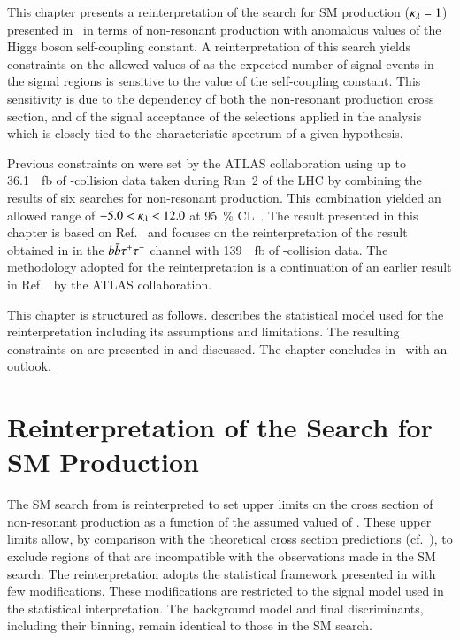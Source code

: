 This chapter presents a reinterpretation of the search for SM \HH
production ($\kappa_{\lambda} = 1$) presented in~ in terms
of non-resonant \HH production with anomalous values of the Higgs
boson self-coupling constant. A reinterpretation of this search yields
constraints on the allowed values of \klambda as the expected number
of signal events in the signal regions is sensitive to the value of
the self-coupling constant. This sensitivity is due to the \klambda
dependency of both the non-resonant \HH production cross section, and
of the signal acceptance of the selections applied in the analysis
which is closely tied to the characteristic \mHH spectrum of a given
\klambda hypothesis.

Previous constraints on \klambda were set by the ATLAS collaboration
using up to \SI{36.1}{\per\femto\barn} of \pp-collision data taken
during Run~2 of the LHC by combining the results of six searches for
non-resonant \HH production. This combination yielded an allowed range
of $-5.0 < \kappa_{\lambda} < 12.0$ at \SI{95}{\percent}
CL~\cite{HDBS-2018-58}. The result presented in this chapter is based
on Ref.~\cite{ATLAS-CONF-2021-052} and focuses on the reinterpretation
of the result obtained in  in the $b\bar{b}\tau^{+} \tau^{-}$
channel with \SI{139}{\per\femto\barn} of \pp-collision data. The
methodology adopted for the reinterpretation is a continuation of an
earlier result in Ref.~\cite{HDBS-2018-58} by the ATLAS collaboration.

This chapter is structured as follows. 
describes the statistical model used for the reinterpretation
including its assumptions and limitations. The resulting constraints
on \klambda are presented in  and
discussed. The chapter concludes
in~ with an outlook.


\section{Reinterpretation of the Search for SM \HH Production}%
\label{sec:reinterpretation}

The SM \HH search from  is reinterpreted to set
upper limits on the cross section of non-resonant \HH production as a
function of the assumed valued of \klambda. These upper limits allow,
by comparison with the theoretical cross section predictions
(cf.~), to exclude regions of \klambda that are
incompatible with the observations made in the SM \HH search. The
reinterpretation adopts the statistical framework presented in
 with few modifications. These
modifications are restricted to the signal model used in the
statistical interpretation. The background model and final
discriminants, including their binning, remain identical to those in
the SM \HH search.

